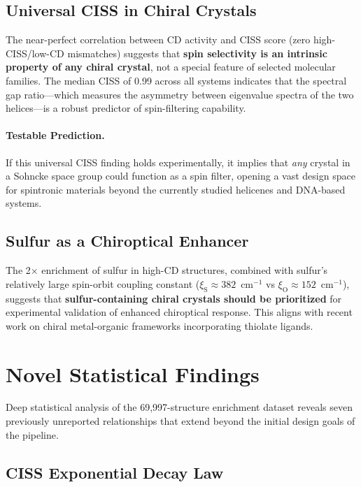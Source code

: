 \documentclass[11pt,a4paper]{article}
\begin{document}
\subsection{Universal CISS in Chiral Crystals}

The near-perfect correlation between CD activity and CISS score (zero high-CISS/low-CD mismatches) suggests that \textbf{spin selectivity is an intrinsic property of any chiral crystal}, not a special feature of selected molecular families. The median CISS of 0.99 across all systems indicates that the spectral gap ratio---which measures the asymmetry between eigenvalue spectra of the two helices---is a robust predictor of spin-filtering capability.

\paragraph{Testable Prediction.} If this universal CISS finding holds experimentally, it implies that \emph{any} crystal in a Sohncke space group could function as a spin filter, opening a vast design space for spintronic materials beyond the currently studied helicenes and DNA-based systems.

\subsection{Sulfur as a Chiroptical Enhancer}

The 2$\times$ enrichment of sulfur in high-CD structures, combined with sulfur's relatively large spin-orbit coupling constant ($\xi_{\text{S}} \approx 382$~cm$^{-1}$ vs $\xi_{\text{O}} \approx 152$~cm$^{-1}$), suggests that \textbf{sulfur-containing chiral crystals should be prioritized} for experimental validation of enhanced chiroptical response. This aligns with recent work on chiral metal-organic frameworks incorporating thiolate ligands.

\section{Novel Statistical Findings}

Deep statistical analysis of the 69,997-structure enrichment dataset reveals seven previously unreported relationships that extend beyond the initial design goals of the pipeline.

\subsection{CISS Exponential Decay Law}
\end{document}
